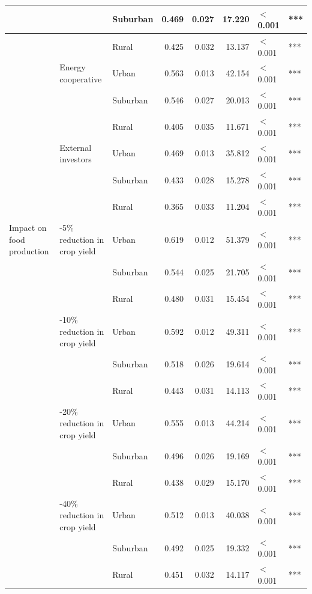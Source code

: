 \begin{longtable}[t]{>{\raggedright\arraybackslash}p{4cm}>{\raggedright\arraybackslash}p{4cm}>{\raggedright\arraybackslash}p{2.5cm}rrrll}
\cmidrule{3-8}\nopagebreak
 &  & Suburban & 0.469 & 0.027 & 17.220 & $<$0.001 & ***\\
\cmidrule{3-8}\nopagebreak
 &  & Rural & 0.425 & 0.032 & 13.137 & $<$0.001 & ***\\
\cmidrule{2-8}\nopagebreak
 & Energy cooperative & Urban & 0.563 & 0.013 & 42.154 & $<$0.001 & ***\\
\cmidrule{3-8}\nopagebreak
 &  & Suburban & 0.546 & 0.027 & 20.013 & $<$0.001 & ***\\
\cmidrule{3-8}\nopagebreak
 &  & Rural & 0.405 & 0.035 & 11.671 & $<$0.001 & ***\\
\cmidrule{2-8}\nopagebreak
 & External investors & Urban & 0.469 & 0.013 & 35.812 & $<$0.001 & ***\\
\cmidrule{3-8}\nopagebreak
 &  & Suburban & 0.433 & 0.028 & 15.278 & $<$0.001 & ***\\
\cmidrule{3-8}\nopagebreak
 &  & Rural & 0.365 & 0.033 & 11.204 & $<$0.001 & ***\\
\cmidrule{1-8}\pagebreak[0]
Impact on food production & 0-5\% reduction in crop yield & Urban & 0.619 & 0.012 & 51.379 & $<$0.001 & ***\\
\cmidrule{3-8}\nopagebreak
 &  & Suburban & 0.544 & 0.025 & 21.705 & $<$0.001 & ***\\
\cmidrule{3-8}\nopagebreak
 &  & Rural & 0.480 & 0.031 & 15.454 & $<$0.001 & ***\\
\cmidrule{2-8}\nopagebreak
 & 6-10\% reduction in crop yield & Urban & 0.592 & 0.012 & 49.311 & $<$0.001 & ***\\
\cmidrule{3-8}\nopagebreak
 &  & Suburban & 0.518 & 0.026 & 19.614 & $<$0.001 & ***\\
\cmidrule{3-8}\nopagebreak
 &  & Rural & 0.443 & 0.031 & 14.113 & $<$0.001 & ***\\
\cmidrule{2-8}\nopagebreak
 & 11-20\% reduction in crop yield & Urban & 0.555 & 0.013 & 44.214 & $<$0.001 & ***\\
\cmidrule{3-8}\nopagebreak
 &  & Suburban & 0.496 & 0.026 & 19.169 & $<$0.001 & ***\\
\cmidrule{3-8}\nopagebreak
 &  & Rural & 0.438 & 0.029 & 15.170 & $<$0.001 & ***\\
\cmidrule{2-8}\nopagebreak
 & 21-40\% reduction in crop yield & Urban & 0.512 & 0.013 & 40.038 & $<$0.001 & ***\\
\cmidrule{3-8}\nopagebreak
 &  & Suburban & 0.492 & 0.025 & 19.332 & $<$0.001 & ***\\
\cmidrule{3-8}\nopagebreak
 &  & Rural & 0.451 & 0.032 & 14.117 & $<$0.001 & ***\\

\end{longtable}
